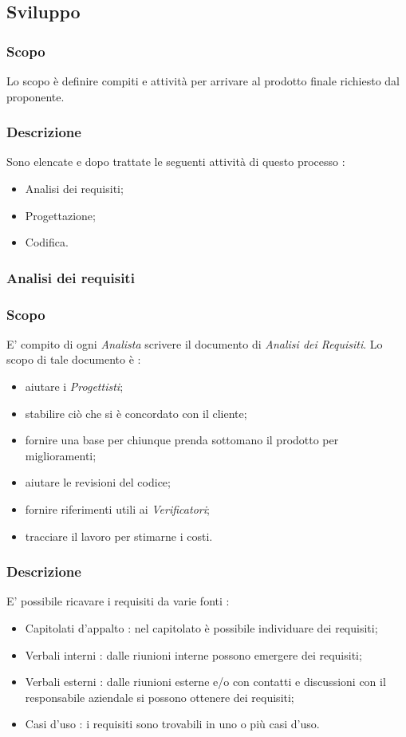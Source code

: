 \subsection{Sviluppo}
\subsubsection{Scopo}
Lo scopo è definire compiti e attività per arrivare al prodotto finale richiesto dal proponente.
\subsubsection{Descrizione}
Sono elencate e dopo trattate le seguenti attività di questo processo :
\begin{itemize}
  \item Analisi dei requisiti;
  \item Progettazione;
  \item Codifica.
\end{itemize}
\subsubsection{Analisi dei requisiti}
\subsubsection{Scopo}
E’ compito di ogni \textit{Analista} scrivere il documento di \textit{Analisi dei Requisiti}. Lo scopo di tale documento è :
\begin{itemize}
  \item aiutare i \textit{Progettisti};
  \item stabilire ciò che si è concordato con il cliente;
  \item fornire una base per chiunque prenda sottomano il prodotto per miglioramenti;
  \item aiutare le revisioni del codice;
  \item fornire riferimenti utili ai \textit{Verificatori};
  \item tracciare il lavoro per stimarne i costi.
\end{itemize}

\subsubsection{Descrizione}
E' possibile ricavare i requisiti da varie fonti : 
\begin{itemize}
    \item Capitolati d’appalto : nel capitolato è possibile individuare dei requisiti;
    \item Verbali interni : dalle riunioni interne possono emergere dei requisiti;
    \item Verbali esterni : dalle riunioni esterne e/o con contatti e discussioni con il responsabile aziendale si possono ottenere dei requisiti;
    \item Casi d’uso : i requisiti sono trovabili in uno o più casi d’uso.
\end{itemize}

